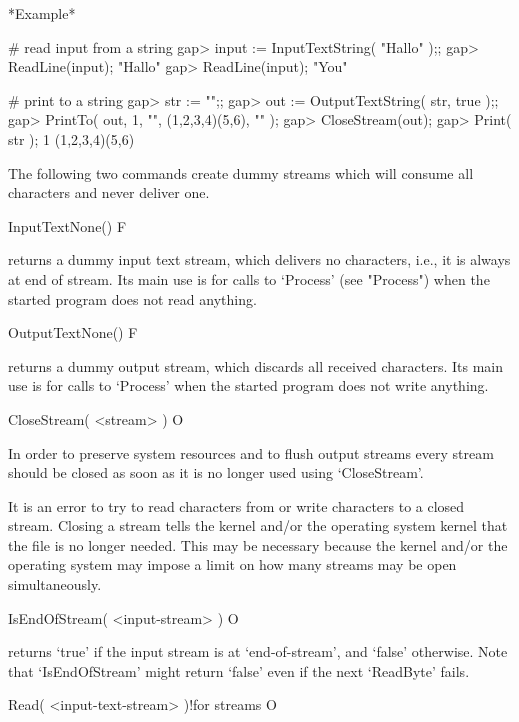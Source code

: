*Example*

\begintt
# read input from a string
gap> input := InputTextString( "Hallo\nYou\n" );;
gap> ReadLine(input);
"Hallo\n"
gap> ReadLine(input);
"You\n"

# print to a string
gap> str := "";;
gap> out := OutputTextString( str, true );;
gap> PrintTo( out, 1, "\n", (1,2,3,4)(5,6), "\n" );
gap> CloseStream(out);
gap> Print( str );
1
(1,2,3,4)(5,6)
\endtt


The following  two commands create  dummy streams  which will consume all
characters and never deliver one.


\>InputTextNone() F

returns a dummy input text stream, which delivers no characters, i.e., it
is always at end of stream.  Its main use  is for calls to `Process' (see
"Process") when the started program does not read anything.

\>OutputTextNone() F

returns a dummy output   stream, which discards all received  characters.
Its main use is for calls to `Process' when  the started program does not
write anything.


\>CloseStream( <stream> ) O

In order  to preserve system resources  and to flush output streams every
stream should  be  closed  as soon   as  it is   no longer   used using
`CloseStream'.

It is an error to  try to read  characters from or  write characters to a
closed  stream.   Closing a  stream tells  the {\GAP}   kernel and/or the
operating system kernel  that the file is  no longer needed.  This may be
necessary  because  the {\GAP} kernel  and/or  the  operating  system may
impose a limit on how many streams may be open simultaneously.


\>IsEndOfStream( <input-stream> ) O

returns `true' if  the input stream  is  at `end-of-stream', and  `false'
otherwise.  Note  that `IsEndOfStream' might return  `false' even  if the
next `ReadByte' fails.

\>Read( <input-text-stream> )!{for streams} O

